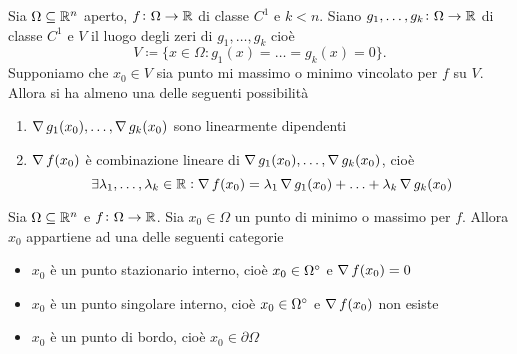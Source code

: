 \begin{thm}
	Sia $ \Omega \subseteq \mathbb{R}^n $ aperto, $ f \colon \Omega \to \mathbb{R} $ di classe $ C^1 $ e $ k < n $. Siano $ g_1, \ldots, g_k \colon \Omega \to \mathbb{R} $ di classe $ C^1 $ e $ V $ il luogo degli zeri di $ g_1, \ldots, g_k $ cioè 
	\begin{equation*}
		V \coloneqq \{x \in \Omega : g_1(x) = \ldots = g_k(x) = 0\}.
	\end{equation*}
	Supponiamo che $ x_0 \in V $ sia punto mi massimo o minimo vincolato per $ f $ su $ V $. Allora si ha almeno una delle seguenti possibilità
	\begin{enumerate}[label = (\roman*)]
		\item $ \operatorname{\nabla}{g_1}(x_0), \ldots, \operatorname{\nabla}{g_k}(x_0) $ sono linearmente dipendenti
		\item $ \operatorname{\nabla}{f}(x_0) $ è combinazione lineare di $ \operatorname{\nabla}{g_1}(x_0), \ldots, \operatorname{\nabla}{g_k}(x_0) $, cioè 
		\begin{equation}
			\exists \lambda_1, \ldots, \lambda_k \in \mathbb{R} : \operatorname{\nabla}{f}(x_0) = \lambda_1 \operatorname{\nabla}{g_1}(x_0) + \ldots +\lambda_k \operatorname{\nabla}{g_k}(x_0)
		\end{equation}
	\end{enumerate}
\end{thm}

\begin{prop}
	Sia $ \Omega \subseteq \mathbb{R}^n $ e $ f \colon \Omega \to \mathbb{R} $. Sia $ x_0 \in \Omega $ un punto di minimo o massimo per $ f $. Allora $ x_0 $ appartiene ad una delle seguenti categorie
	\begin{itemize}
		\item $ x_0 $ è un punto stazionario interno, cioè $ x_0 \in {\Omega}^{\circ} $ e $ \operatorname{\nabla}{f}(x_0) = 0 $
		\item $ x_0 $ è un punto singolare interno, cioè $ x_0 \in {\Omega}^{\circ} $ e $ \operatorname{\nabla}{f}(x_0) $ non esiste
		\item $ x_0 $ è un punto di bordo, cioè $ x_0 \in \partial \Omega $
	\end{itemize}
\end{prop}